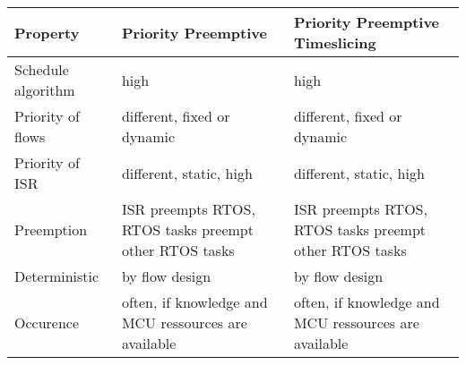 \begin{sidewaystable}
  \begin{tabularx}{\textwidth}{l X X}
    \hline
    Property           & Priority Preemptive                                    & Priority Preemptive Timeslicing                        \\\hline
    Schedule algorithm & high                                                   & high                                                   \\
    Priority of flows  & different, fixed or dynamic                            & different, fixed or dynamic                            \\
    Priority of ISR    & different, static, high                                & different, static, high                                \\
    Preemption         & ISR preempts RTOS, RTOS tasks preempt other RTOS tasks & ISR preempts RTOS, RTOS tasks preempt other RTOS tasks \\
    Deterministic      & by flow design                                         & by flow design                                         \\
    Occurence          & often, if knowledge and MCU ressources are available   & often, if knowledge and MCU ressources are available   \\\hline
  \end{tabularx}
\end{sidewaystable}